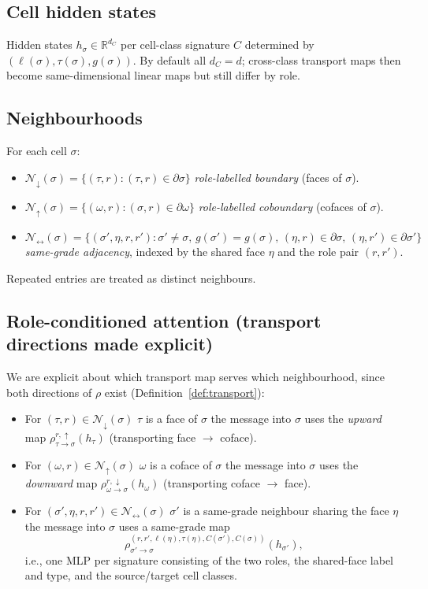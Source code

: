 \documentclass[11pt]{article}
\theoremstyle{definition}
\theoremstyle{plain}
\newcommand{\R}{\mathbb{R}}
\begin{document}
\subsection{Cell hidden states}

Hidden states $h_\sigma \in \R^{d_C}$ per cell-class signature $C$ determined by $(\ell(\sigma), \tau(\sigma), g(\sigma))$. By default all $d_C = d$; cross-class transport maps then become same-dimensional linear maps but still differ by role.

\subsection{Neighbourhoods}

For each cell $\sigma$:
\begin{itemize}
\item $\mathcal{N}_{\downarrow}(\sigma) = \{(\tau, r) : (\tau, r) \in \partial \sigma\}$ \emph{role-labelled boundary} (faces of $\sigma$).
\item $\mathcal{N}_{\uparrow}(\sigma) = \{(\omega, r) : (\sigma, r) \in \partial \omega\}$ \emph{role-labelled coboundary} (cofaces of $\sigma$).
\item $\mathcal{N}_{\leftrightarrow}(\sigma) = \{(\sigma', \eta, r, r') : \sigma' \neq \sigma,\, g(\sigma') = g(\sigma),\, (\eta, r) \in \partial \sigma,\, (\eta, r') \in \partial \sigma'\}$ \emph{same-grade adjacency}, indexed by the shared face $\eta$ and the role pair $(r, r')$.
\end{itemize}
Repeated entries are treated as distinct neighbours.

\subsection{Role-conditioned attention (transport directions made explicit)}\label{sec:attention}

We are explicit about which transport map serves which neighbourhood, since both directions of $\rho$ exist (Definition~\ref{def:transport}):
\begin{itemize}
\item For $(\tau, r) \in \mathcal{N}_{\downarrow}(\sigma)$ $\tau$ is a face of $\sigma$ the message into $\sigma$ uses the \emph{upward} map $\rho^{r,\uparrow}_{\tau \to \sigma}(h_\tau)$ (transporting face $\to$ coface).
\item For $(\omega, r) \in \mathcal{N}_{\uparrow}(\sigma)$ $\omega$ is a coface of $\sigma$ the message into $\sigma$ uses the \emph{downward} map $\rho^{r,\downarrow}_{\omega \to \sigma}(h_\omega)$ (transporting coface $\to$ face).
\item For $(\sigma', \eta, r, r') \in \mathcal{N}_{\leftrightarrow}(\sigma)$  $\sigma'$ is a same-grade neighbour sharing the face $\eta$ the message into $\sigma$ uses a same-grade map
\[
\rho^{(r, r', \ell(\eta), \tau(\eta), C(\sigma'), C(\sigma))}_{\sigma' \to \sigma}(h_{\sigma'}),
\]
i.e., one MLP per signature consisting of the two roles, the shared-face label and type, and the source/target cell classes.
\end{itemize}
\end{document}
